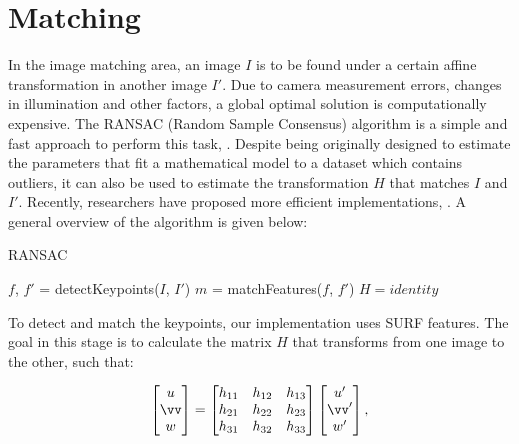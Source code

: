 \documentclass[12pt]{article}
\begin{document}
\FloatBarrier %
\section{Matching}

In the image matching area, an image $I$ is to be found under a certain affine transformation in another image $I'$.
Due to camera measurement errors, changes in illumination and other factors, a global optimal solution is computationally expensive.
The RANSAC (Random Sample Consensus) algorithm is a simple and fast approach to perform this task, \cite{Fischler1981}.
Despite being originally designed to estimate the parameters that fit a mathematical model to a dataset which contains outliers, it can also be used to estimate the transformation $H$ that matches $I$ and $I'$.
Recently, researchers have proposed more efficient implementations, \cite{Dung2013}.
A general overview of the algorithm is given below:

\begin{algorithm}[H]
 \caption{RANSAC}
 $f$, $f'$ = detectKeypoints($I$, $I'$)\;
 $m$ = matchFeatures($f$, $f'$)\;
 $H = identity$\;
\end{algorithm}

To detect and match the keypoints, our implementation uses SURF features.
The goal in this stage is to calculate the matrix $H$ that transforms from one image to the other, such that:

\begin{equation}
\begin{bmatrix}
u \\ 
\vv \\ 
w
\end{bmatrix}
= 
\begin{bmatrix}
 h_{11} & h_{12} & h_{13} \\ 
 h_{21} & h_{22} & h_{23}\\ 
 h_{31} & h_{32} & h_{33}
\end{bmatrix}
\begin{bmatrix}
u' \\
\vv' \\
w'
\end{bmatrix},
\label{eq:originalH}
\end{equation}
\end{document}
